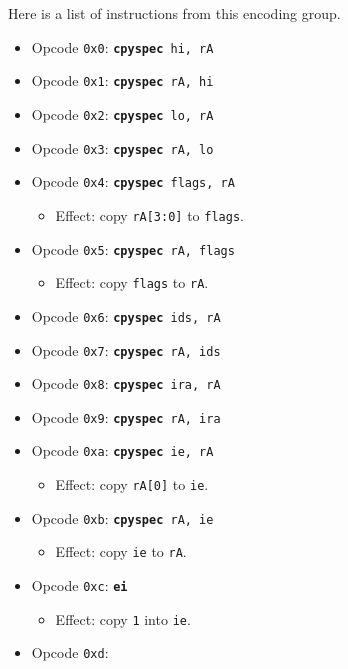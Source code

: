 \documentclass{article}
\begin{document}
	Here is a list of instructions from this encoding group.

	\singlespacing
	\begin{itemize}
		\item Opcode \texttt{0x0}:
			\texttt{\textbf{cpyspec} hi, rA}
		\item Opcode \texttt{0x1}:
			\texttt{\textbf{cpyspec} rA, hi}
		\item Opcode \texttt{0x2}:
			\texttt{\textbf{cpyspec} lo, rA}
		\item Opcode \texttt{0x3}:
			\texttt{\textbf{cpyspec} rA, lo}
		\item Opcode \texttt{0x4}:
			\texttt{\textbf{cpyspec} flags, rA}
		\begin{itemize}
			\item Effect:  copy \texttt{rA[3:0]} to \texttt{flags}.
		\end{itemize}
		\item Opcode \texttt{0x5}:
			\texttt{\textbf{cpyspec} rA, flags}
		\begin{itemize}
			\item Effect:  copy \texttt{flags} to \texttt{rA}.
		\end{itemize}
		\item Opcode \texttt{0x6}:
			\texttt{\textbf{cpyspec} ids, rA}
		\item Opcode \texttt{0x7}:
			\texttt{\textbf{cpyspec} rA, ids}
		\item Opcode \texttt{0x8}:
			\texttt{\textbf{cpyspec} ira, rA}
		\item Opcode \texttt{0x9}:
			\texttt{\textbf{cpyspec} rA, ira}
		\item Opcode \texttt{0xa}:
			\texttt{\textbf{cpyspec} ie, rA}
		\begin{itemize}
			\item Effect:  copy \texttt{rA[0]} to \texttt{ie}.
		\end{itemize}
		\item Opcode \texttt{0xb}:
			\texttt{\textbf{cpyspec} rA, ie}
		\begin{itemize}
			\item Effect:  copy \texttt{ie} to \texttt{rA}.
		\end{itemize}
		\item Opcode \texttt{0xc}:
			\texttt{\textbf{ei}}
		\begin{itemize}
			\item Effect:  copy \texttt{1} into \texttt{ie}.
		\end{itemize}
		\item Opcode \texttt{0xd}:

\end{itemize}
\end{document}
